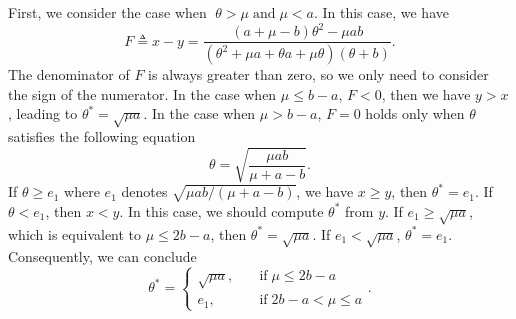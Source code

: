 \documentclass[letterpaper]{article} %
\begin{document}
First, we consider the case when $\;\theta>\mu\; \text{and}\;  \mu<a$. In this case, we have 
\begin{equation*}
F \triangleq x-y =\frac{\left(a + \mu - b\right)\theta^2 - \mu ab}{(\theta^2+\mu a+\theta a+\mu\theta)(\theta+b)}.
\end{equation*}
The denominator of $F$ is always greater than zero, so we only need to consider the sign of the numerator. In the case when $\mu\leq b-a$, $F <0 $, then we have $y > x$, leading to $\theta^*=\sqrt{\mu a}$. In the case when $\mu> b-a$, $F = 0$ holds only when $\theta$ satisfies the following equation
\begin{equation*}
\theta = \sqrt{\frac{\mu a b}{\mu+a-b}}.
\end{equation*}
If $\theta\geq e_1$ where $e_1$ denotes $\sqrt{\mu a b/(\mu+a-b)}$, we have $x\geq y$, then $\theta^*=e_1$. If $\theta < e_1$, then $x < y$. In this case, we should compute $\theta^*$ from $y$. If $e_1\geq \sqrt{\mu a}$, which is equivalent to $\mu\leq 2b-a$, then $\theta^*=\sqrt{\mu a}$. If $e_1 < \sqrt{\mu a}$, $\theta^* = e_1$. Consequently, we can conclude 
  \begin{equation}\label{theta1}
	\theta^*=
	\begin{cases}
            \sqrt{\mu a},\quad & \text{if}\;\mu\leq 2b-a  \\
		e_1,\quad & \text{if}\;2b-a<\mu\leq a 
	\end{cases}.
\end{equation}
\end{document}
